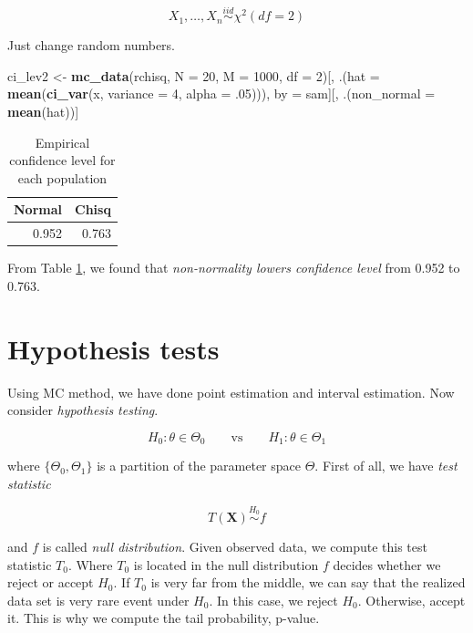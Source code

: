 \documentclass[]{book}
\newenvironment{Shaded}{\begin{snugshade}}{\end{snugshade}}
\newcommand{\DataTypeTok}[1]{\textcolor[rgb]{0.13,0.29,0.53}{#1}}
\newcommand{\DecValTok}[1]{\textcolor[rgb]{0.00,0.00,0.81}{#1}}
\newcommand{\FloatTok}[1]{\textcolor[rgb]{0.00,0.00,0.81}{#1}}
\newcommand{\KeywordTok}[1]{\textcolor[rgb]{0.13,0.29,0.53}{\textbf{#1}}}
\newcommand{\NormalTok}[1]{#1}
\newcommand{\StringTok}[1]{\textcolor[rgb]{0.31,0.60,0.02}{#1}}
\theoremstyle{definition}
\theoremstyle{definition}
\theoremstyle{definition}
\theoremstyle{remark}
\begin{document}
\[X_1, \ldots, X_n \stackrel{iid}{\sim}\chi^2(df = 2)\]

Just change random numbers.

\begin{Shaded}
\begin{Highlighting}[]
\NormalTok{ci_lev2 <-}
\StringTok{  }\KeywordTok{mc_data}\NormalTok{(rchisq, }\DataTypeTok{N =} \DecValTok{20}\NormalTok{, }\DataTypeTok{M =} \DecValTok{1000}\NormalTok{, }\DataTypeTok{df =} \DecValTok{2}\NormalTok{)[,}
\NormalTok{                                            .(}\DataTypeTok{hat =} \KeywordTok{mean}\NormalTok{(}\KeywordTok{ci_var}\NormalTok{(x, }\DataTypeTok{variance =} \DecValTok{4}\NormalTok{, }\DataTypeTok{alpha =} \FloatTok{.05}\NormalTok{))),}
\NormalTok{                                            by =}\StringTok{ }\NormalTok{sam][,}
\NormalTok{                                                      .(}\DataTypeTok{non_normal =} \KeywordTok{mean}\NormalTok{(hat))]}
\end{Highlighting}
\end{Shaded}

\begin{longtable}{r|r}
\caption{\label{tab:emlevpop}Empirical confidence level for each population}\\
\hline
Normal & Chisq\\
\hline
0.952 & 0.763\\
\hline
\end{longtable}

From Table \ref{tab:emlevpop}, we found that \emph{non-normality lowers confidence level} from 0.952 to 0.763.

\hypertarget{hypothesis-tests}{%
\section{Hypothesis tests}\label{hypothesis-tests}}

Using MC method, we have done point estimation and interval estimation. Now consider \emph{hypothesis testing}.

\[H_0: \theta \in \Theta_0 \qquad \text{vs} \qquad H_1: \theta \in \Theta_1\]

where \(\{ \Theta_0, \Theta_1 \}\) is a partition of the parameter space \(\Theta\). First of all, we have \emph{test statistic}

\[T(\mathbf{X}) \stackrel{H_0}{\sim}f\]

and \(f\) is called \emph{null distribution}. Given observed data, we compute this test statistic \(T_0\). Where \(T_0\) is located in the null distribution \(f\) decides whether we reject or accept \(H_0\). If \(T_0\) is very far from the middle, we can say that the realized data set is very rare event under \(H_0\). In this case, we reject \(H_0\). Otherwise, accept it. This is why we compute the tail probability, p-value.
\end{document}
